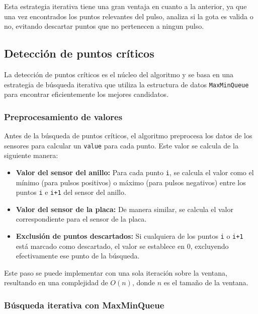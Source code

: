 \documentclass[12pt,a4paper]{article}
\begin{document}
Esta estrategia iterativa tiene una gran ventaja en cuanto a la anterior, ya que una vez encontrados los puntos relevantes del pulso, analiza si la gota es valida o no, evitando descartar puntos que no pertenecen a ningun pulso.

\subsection{Detección de puntos críticos}

La detección de puntos críticos es el núcleo del algoritmo y se basa en una estrategia de búsqueda iterativa que utiliza la estructura de datos \texttt{MaxMinQueue} para encontrar eficientemente los mejores candidatos.

\subsubsection{Preprocesamiento de valores}

Antes de la búsqueda de puntos críticos, el algoritmo preprocesa los datos de los sensores para calcular un \texttt{value} para cada punto. Este valor se calcula de la siguiente manera:

\begin{itemize}
    \item \textbf{Valor del sensor del anillo:} Para cada punto \texttt{i}, se calcula el valor como el mínimo (para pulsos positivos) o máximo (para pulsos negativos) entre los puntos \texttt{i} e \texttt{i+1} del sensor del anillo.
    
    \item \textbf{Valor del sensor de la placa:} De manera similar, se calcula el valor correspondiente para el sensor de la placa.
    
    \item \textbf{Exclusión de puntos descartados:} Si cualquiera de los puntos \texttt{i} o \texttt{i+1} está marcado como descartado, el valor se establece en 0, excluyendo efectivamente ese punto de la búsqueda.
\end{itemize}

Este paso se puede implementar con una sola iteración sobre la ventana, resultando en una complejidad de $O(n)$, donde $n$ es el tamaño de la ventana.

\subsubsection{Búsqueda iterativa con MaxMinQueue}
\end{document}
